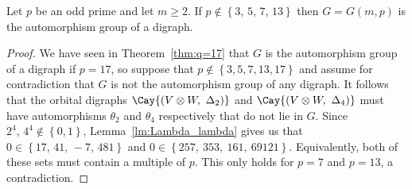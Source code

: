 \begin{theorem} \label{thm:q-large-prime}
Let $p$ be an odd prime and let $m \geqslant 2$. If $p \notin \left\{3,\, 5,\, 7,\, 13 \right\}$ then $G = G{\left(m, p \right)}$ is the automorphism group of a digraph.
\end{theorem}
\begin{proof}
We have seen in Theorem~\ref{thm:q=17} that $G$ is the automorphism group of a digraph if $p = 17$, so suppose that $p \notin \left\{3, 5, 7, 13, 17 \right\}$ and assume for contradiction that $G$ is not the automorphism group of any digraph. It follows that the orbital digraphs $\Cay{\left(V \otimes W,\ \Delta_2 \right)}$ and $\Cay{\left(V \otimes W,\ \Delta_4 \right)}$ must have automorphisms $\theta_2$ and $\theta_4$ respectively that do not lie in $G$. Since $2^4,\, 4^4 \notin \left\{0, 1 \right\}$, Lemma~\ref{lm:Lambda_lambda} gives us that $0 \in \left\{17,\, 41,\, -7,\, 481 \right\}$ and $0 \in \left\{257,\ 353,\ 161,\ 69121 \right\}$. Equivalently, both of these sets must contain a multiple of $p$. This only holds for $p=7$ and $p=13$, a contradiction.
\end{proof}


